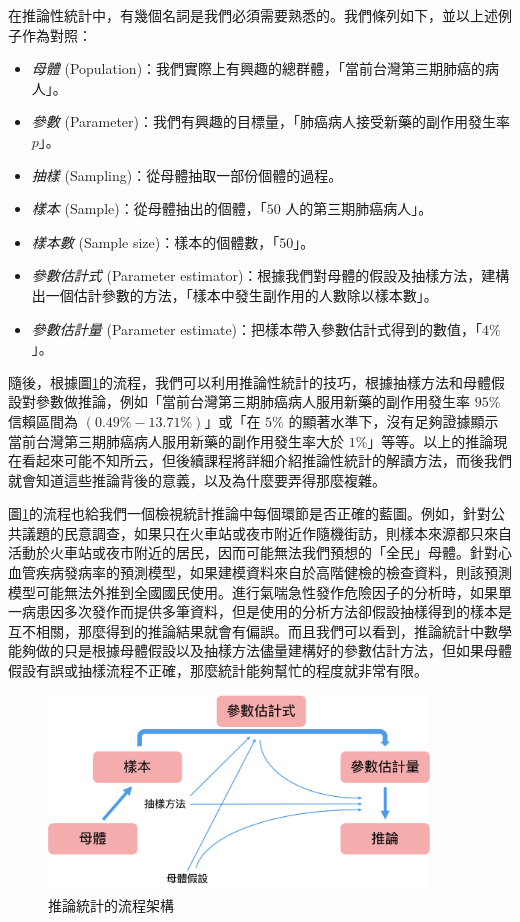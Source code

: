     在推論性統計中，有幾個名詞是我們必須需要熟悉的。我們條列如下，並以上述例子作為對照：

    \begin{itemize}
        \item \textit{母體} (Population)：我們實際上有興趣的總群體，「當前台灣第三期肺癌的病人」。
        \item \textit{參數} (Parameter)：我們有興趣的目標量，「肺癌病人接受新藥的副作用發生率 $p$」。
        \item \textit{抽樣} (Sampling)：從母體抽取一部份個體的過程。
        \item \textit{樣本} (Sample)：從母體抽出的個體，「$50$ 人的第三期肺癌病人」。
        \item \textit{樣本數} (Sample size)：樣本的個體數，「$50$」。
        \item \textit{參數估計式} (Parameter estimator)：根據我們對母體的假設及抽樣方法，建構出一個估計參數的方法，「樣本中發生副作用的人數除以樣本數」。
        \item \textit{參數估計量} (Parameter estimate)：把樣本帶入參數估計式得到的數值，「$4\%$」。
    \end{itemize}

    隨後，根據圖\ref{fig:flowchart}的流程，我們可以利用推論性統計的技巧，根據抽樣方法和母體假設對參數做推論，例如「當前台灣第三期肺癌病人服用新藥的副作用發生率 $95\%$ 信賴區間為 $(0.49\% - 13.71\%)$」或「在 $5\%$ 的顯著水準下，沒有足夠證據顯示當前台灣第三期肺癌病人服用新藥的副作用發生率大於 $1\%$」等等。以上的推論現在看起來可能不知所云，但後續課程將詳細介紹推論性統計的解讀方法，而後我們就會知道這些推論背後的意義，以及為什麼要弄得那麼複雜。
    
    圖\ref{fig:flowchart}的流程也給我們一個檢視統計推論中每個環節是否正確的藍圖。例如，針對公共議題的民意調查，如果只在火車站或夜市附近作隨機街訪，則樣本來源都只來自活動於火車站或夜市附近的居民，因而可能無法我們預想的「全民」母體。針對心血管疾病發病率的預測模型，如果建模資料來自於高階健檢的檢查資料，則該預測模型可能無法外推到全國國民使用。進行氣喘急性發作危險因子的分析時，如果單一病患因多次發作而提供多筆資料，但是使用的分析方法卻假設抽樣得到的樣本是互不相關，那麼得到的推論結果就會有偏誤。而且我們可以看到，推論統計中數學能夠做的只是根據母體假設以及抽樣方法儘量建構好的參數估計方法，但如果母體假設有誤或抽樣流程不正確，那麼統計能夠幫忙的程度就非常有限。
    
    \begin{figure}[htbp]
      \centering
      \includegraphics[width=0.9\textwidth]{figures/01-Overview/flowchart.png}
      \caption{推論統計的流程架構}
      \label{fig:flowchart}
    \end{figure}
    
